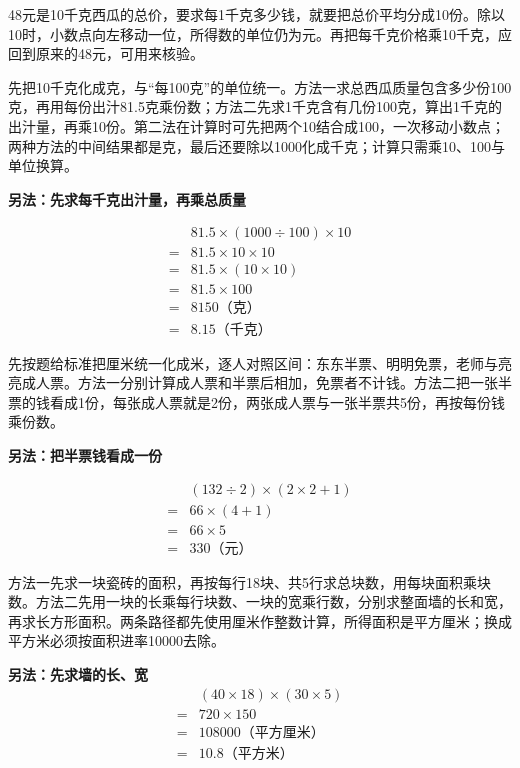 \documentclass[multi=snippet,border=0pt]{standalone}
\newenvironment{snippet}[3]{\begin{minipage}{#1bp}\color{answerred}\fontsize{#2}{#3}\selectfont\raggedright}{\end{minipage}}
\begin{document}
\begin{snippet}{505}{11.5}{14}48元是10千克西瓜的总价，要求每1千克多少钱，就要把总价平均分成10份。除以10时，小数点向左移动一位，所得数的单位仍为元。再把每千克价格乘10千克，应回到原来的48元，可用来核验。\end{snippet}
\begin{snippet}{505}{11.5}{14}先把10千克化成克，与“每100克”的单位统一。方法一求总西瓜质量包含多少份100克，再用每份出汁81.5克乘份数；方法二先求1千克含有几份100克，算出1千克的出汁量，再乘10份。第二法在计算时可先把两个10结合成100，一次移动小数点；两种方法的中间结果都是克，最后还要除以1000化成千克；计算只需乘10、100与单位换算。\par \textbf{另法：先求每千克出汁量，再乘总质量}\par \[\begin{aligned}&81.5\times(1000\div100)\times10\\={}&81.5\times10\times10\\={}&81.5\times(10\times10)\\={}&81.5\times100\\={}&8150\text{（克）}\\={}&8.15\text{（千克）}\end{aligned}\]\end{snippet}
\begin{snippet}{505}{11.5}{14}先按题给标准把厘米统一化成米，逐人对照区间：东东半票、明明免票，老师与亮亮成人票。方法一分别计算成人票和半票后相加，免票者不计钱。方法二把一张半票的钱看成1份，每张成人票就是2份，两张成人票与一张半票共5份，再按每份钱乘份数。\par \textbf{另法：把半票钱看成一份}\par \[\begin{aligned}&(132\div2)\times(2\times2+1)\\={}&66\times(4+1)\\={}&66\times5\\={}&330\text{（元）}\end{aligned}\]\end{snippet}
\begin{snippet}{505}{11.5}{14}方法一先求一块瓷砖的面积，再按每行18块、共5行求总块数，用每块面积乘块数。方法二先用一块的长乘每行块数、一块的宽乘行数，分别求整面墙的长和宽，再求长方形面积。两条路径都先使用厘米作整数计算，所得面积是平方厘米；换成平方米必须按面积进率10000去除。\par \textbf{另法：先求墙的长、宽}\[\begin{aligned}&(40\times18)\times(30\times5)\\={}&720\times150\\={}&108000\text{（平方厘米）}\\={}&10.8\text{（平方米）}\end{aligned}\]\end{snippet}
\end{document}
